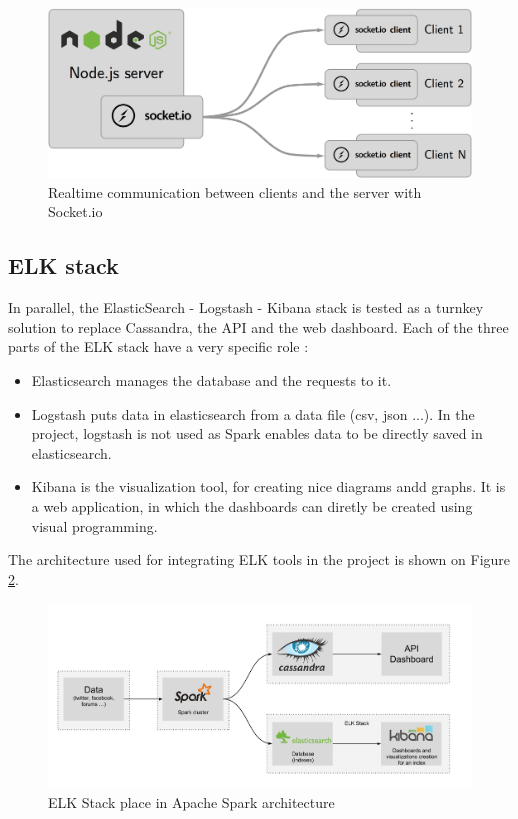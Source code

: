 \documentclass[11pt]{article}
\begin{document}
\begin{figure}[h!]
    \centering
    \includegraphics[scale=0.12]{img/api-dashboard-socket.png}
    \caption{Realtime communication between clients and the server with \textsf{Socket.io}}
    \label{socket}
\end{figure}

\subsection{ELK stack}

In parallel, the \textsf{ElasticSearch} - \textsf{Logstash} - \textsf{Kibana} stack is tested as a turnkey solution to replace \textsf{Cassandra}, the API and the web dashboard. %
Each of the three parts of the ELK stack have a very specific role : 
\begin{itemize}
\item Elasticsearch manages the database and the requests to it.
\item Logstash puts data in elasticsearch from a data file (csv, json ...). In the project, logstash is not used as Spark enables data to be directly saved in elasticsearch.
\item Kibana is the visualization tool, for creating nice diagrams andd graphs. It is a web application, in which the dashboards can diretly be created using visual programming.
\end{itemize}

The architecture used for integrating ELK tools in the project is shown on Figure \ref*{elk}.

\begin{figure}[h!]
    \centering
    \includegraphics[scale=0.12]{img/ELK_use.png}
    \caption{ELK Stack place in Apache Spark architecture}
    \label{elk}
\end{figure}
\end{document}
